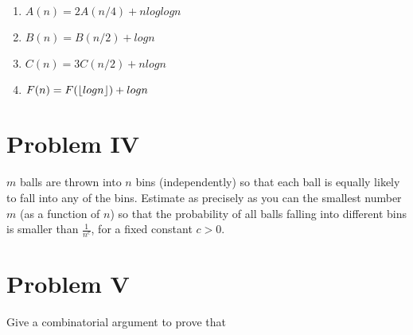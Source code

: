 \documentclass[paper=a4, fontsize=11pt]{scrartcl} %
\DeclarePairedDelimiter\floor{\lfloor}{\rfloor}
\numberwithin{equation}{section} %
\numberwithin{figure}{section} %
\numberwithin{table}{section} %
\begin{document}
\begin{enumerate}[label=(\alph*)]
	\item $A(n)=2A(n/4)+nloglogn$
	\item $B(n) = B(n/2) + log n$
	\item $C(n)=3C(n/2)+nlogn$
	\item $F(n)=F(\floor*{logn})+logn$
\end{enumerate}

\section{Problem IV}
$m$ balls are thrown into $n$ bins (independently) so that each ball is equally likely to fall into any of the bins. Estimate as precisely as you can the smallest number $m$ (as a function of $n$) so that the probability of all balls falling into different bins is smaller than $\frac{1}{n^{c}}$, for a fixed constant $c>0$.

\section{Problem V}
Give a combinatorial argument to prove that
\begin{center}

\end{center}
\end{document}
